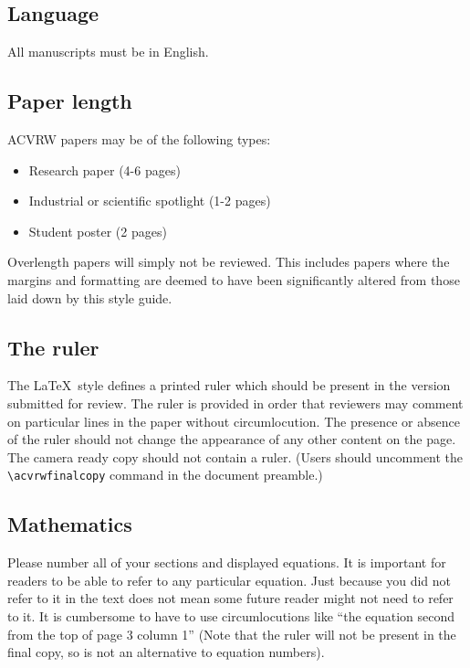 \documentclass[11pt,twoside,twocolumn,a4paper]{article}
\begin{document}
\subsection{Language}

All manuscripts must be in English.


\subsection{Paper length} 

ACVRW papers may be of the following types:

\begin{itemize}

\item Research paper (4-6 pages)
\item Industrial or scientific spotlight (1-2 pages)
\item Student poster (2 pages)
\end{itemize}

Overlength papers will simply not be reviewed. This includes papers where the 
margins and formatting are deemed to have been significantly altered from those 
laid down by this style guide. 


\subsection{The ruler}

The \LaTeX\ style defines a printed ruler which should be present in the version 
submitted for review.  The ruler is provided in order that reviewers may comment 
on particular lines in the paper without circumlocution.  The presence or 
absence of the ruler should not change the appearance of any other content on 
the page.  The camera ready copy should not contain a ruler. (Users should 
uncomment the \verb'\acvrwfinalcopy' command in the document preamble.) 


\subsection{Mathematics}

Please number all of your sections and displayed equations.  It is important for 
readers to be able to refer to any particular equation.  Just because you did 
not refer to it in the text does not mean some future reader might not need to 
refer to it.  It is cumbersome to have to use circumlocutions like ``the 
equation second from the top of page 3 column 1'' (Note that the ruler will not 
be present in the final copy, so is not an alternative to equation numbers). 
\end{document}
